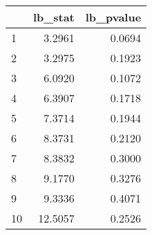 \begin{tabular}{lrr}
\toprule
{} &  lb\_stat &  lb\_pvalue \\
\midrule
1  &   3.2961 &     0.0694 \\
2  &   3.2975 &     0.1923 \\
3  &   6.0920 &     0.1072 \\
4  &   6.3907 &     0.1718 \\
5  &   7.3714 &     0.1944 \\
6  &   8.3731 &     0.2120 \\
7  &   8.3832 &     0.3000 \\
8  &   9.1770 &     0.3276 \\
9  &   9.3336 &     0.4071 \\
10 &  12.5057 &     0.2526 \\
\bottomrule
\end{tabular}
